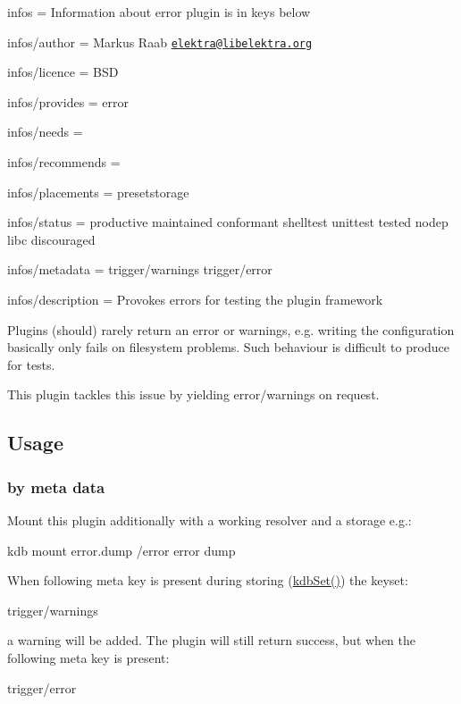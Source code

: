 
\begin{DoxyItemize}
\item infos = Information about error plugin is in keys below
\item infos/author = Markus Raab \href{mailto:elektra@libelektra.org}{\tt elektra@libelektra.\+org}
\item infos/licence = B\+S\+D
\item infos/provides = error
\item infos/needs =
\item infos/recommends =
\item infos/placements = presetstorage
\item infos/status = productive maintained conformant shelltest unittest tested nodep libc discouraged
\item infos/metadata = trigger/warnings trigger/error
\item infos/description = Provokes errors for testing the plugin framework
\end{DoxyItemize}

Plugins (should) rarely return an error or warnings, e.\+g. writing the configuration basically only fails on filesystem problems. Such behaviour is difficult to produce for tests.

This plugin tackles this issue by yielding error/warnings on request.

\subsection*{Usage}

\subsubsection*{by meta data}

Mount this plugin additionally with a working resolver and a storage e.\+g.\+: \begin{DoxyVerb}    kdb mount error.dump /error error dump
\end{DoxyVerb}


When following meta key is present during storing (\hyperlink{group__kdb_ga11436b058408f83d303ca5e996832bcf}{kdb\+Set()}) the keyset\+: \begin{DoxyVerb}    trigger/warnings
\end{DoxyVerb}


a warning will be added. The plugin will still return success, but when the following meta key is present\+: \begin{DoxyVerb}    trigger/error
\end{DoxyVerb}


